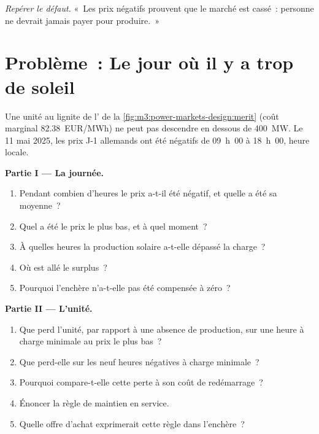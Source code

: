 \begin{exercise}[$\star\star\star$]\label{exo:m3:power-markets-design:8}
\emph{Repérer le défaut.} «~Les prix négatifs prouvent que le marché est cassé~: personne ne devrait jamais payer
pour produire.~»
\end{exercise}

\section{Problème~: Le jour où il y a trop de soleil}

\begin{problem}\label{pb:m3:power-markets-design:1}
Une unité au lignite de l' de la \cref{fig:m3:power-markets-design:merit} (coût
marginal \qty{82.38}{EUR/MWh}) ne peut pas descendre en dessous de 400~MW. Le 11 mai 2025, les prix J-1 allemands
ont été négatifs de 09~h~00 à 18~h~00, heure locale.

\medskip\noindent\textbf{Partie I --- La journée.}
\begin{enumerate}
\item Pendant combien d'heures le prix a-t-il été négatif, et quelle a été sa moyenne~?
\item Quel a été le prix le plus bas, et à quel moment~?
\item À quelles heures la production solaire a-t-elle dépassé la charge~?
\item Où est allé le surplus~?
\item Pourquoi l'enchère n'a-t-elle pas été compensée à zéro~?
\end{enumerate}

\medskip\noindent\textbf{Partie II --- L'unité.}
\begin{enumerate}[resume]
\item Que perd l'unité, par rapport à une absence de production, sur une heure à charge minimale au
prix le plus bas~?
\item Que perd-elle sur les neuf heures négatives à charge minimale~?
\item Pourquoi compare-t-elle cette perte à son coût de redémarrage~?
\item Énoncer la règle de maintien en service.
\item Quelle offre d'achat exprimerait cette règle dans l'enchère~?
\end{enumerate}


\end{problem}

